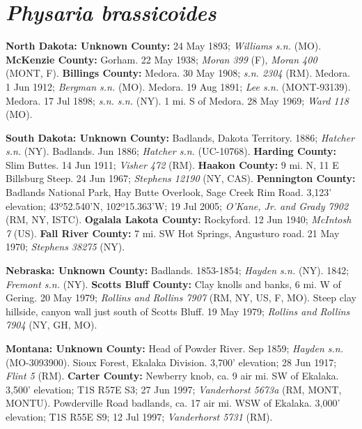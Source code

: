 \section*{\textit{Physaria brassicoides}}

  \textbf{North Dakota: Unknown County:}
24 May 1893; \textit{Williams s.n.} (MO). 
  \textbf{McKenzie County:} 
Gorham. 22 May 1938; \textit{Moran 399} (F), \textit{Moran 400} (MONT, F).  
  \textbf{Billings County:}
Medora. 30 May 1908; \textit{s.n. 2304} (RM).
Medora. 1 Jun 1912; \textit{Bergman s.n.} (MO).
Medora. 19 Aug 1891; \textit{Lee s.n.} (MONT-93139).
Medora. 17 Jul 1898; \textit{s.n. s.n.} (NY).
1 mi. S of Medora. 28 May 1969; \textit{Ward 118} (MO).

  \textbf{South Dakota: Unknown County:}
Badlands, Dakota Territory. 1886; \textit{Hatcher s.n.} (NY).
Badlands. Jun 1886; \textit{Hatcher s.n.} (UC-10768).
  \textbf{Harding County:}
Slim Buttes. 14 Jun 1911; \textit{Visher 472} (RM).
  \textbf{Haakon County:}
9 mi. N, 11 E Billsburg Steep. 24 Jun 1967; \textit{Stephens 12190} (NY, CAS).
  \textbf{Pennington County:}
Badlands National Park, Hay Butte Overlook, Sage Creek Rim Road.
3,123' elevation; 43º52.540'N, 102º15.363'W; 19 Jul 2005;
\textit{O'Kane, Jr. and Grady 7902} (RM, NY, ISTC).
  \textbf{Ogalala Lakota County:}
Rockyford. 12 Jun 1940; \textit{McIntosh 7} (US).
  \textbf{Fall River County:}
7 mi. SW Hot Springs, Angusturo road. 21 May 1970; \textit{Stephens 38275} (NY).

  \textbf{Nebraska: Unknown County:}
Badlands. 1853-1854; \textit{Hayden s.n.} (NY).
1842; \textit{Fremont s.n.} (NY).
  \textbf{Scotts Bluff County:}
Clay knolls and banks, 6 mi. W of Gering. 20 May 1979;
\textit{Rollins and Rollins 7907} (RM, NY, US, F, MO).
Steep clay hillside, canyon wall just south of Scotts Bluff. 19 May 1979;
\textit{Rollins and Rollins 7904} (NY, GH, MO).

  \textbf{Montana: Unknown County:}
Head of Powder River. Sep 1859; \textit{Hayden s.n.} (MO-3093900).
Sioux Forest, Ekalaka Division. 3,700' elevation; 28 Jun 1917;
\textit{Flint 5} (RM).
  \textbf{Carter County:}
Newberry knob, ca. 9 air mi. SW of Ekalaka. 3,500' elevation; T1S R57E S3;
27 Jun 1997; \textit{Vanderhorst 5673a} (RM, MONT, MONTU).
Powderville Road badlands, ca. 17 air mi. WSW of Ekalaka. 3,000' elevation;
T1S R55E S9; 12 Jul 1997; \textit{Vanderhorst 5731} (RM).

